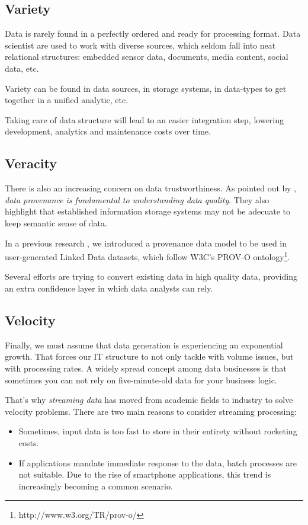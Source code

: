 \subsection{Variety}

Data is rarely found in a perfectly ordered and ready for processing format. Data scientist are used to work with diverse sources, which seldom fall into neat relational structures: embedded sensor data, documents, media content, social data, etc.

Variety can be found in data sources, in storage systems, in data-types to get together in a unified analytic, etc.

Taking care of data structure will lead to an easier integration step, lowering development, analytics and maintenance costs over time.

\subsection{Veracity}

There is also an increasing concern on data trustworthiness. As pointed out by \cite{buneman2013data}, \textit{data provenance is fundamental to understanding data quality}. They also highlight that established information storage systems may not be adecuate to keep semantic sense of data.

In a previous research \cite{emalditrust}, we introduced a provenance data model to be used in user-generated Linked Data datasets, which follow W3C's PROV-O ontology\footnote{http://www.w3.org/TR/prov-o/}.

Several efforts are trying to convert existing data in high quality data, providing an extra confidence layer in which data analysts can rely. 

\subsection{Velocity}

Finally, we must assume that data generation is experiencing an exponential growth. That forces our IT structure to not only tackle with volume issues, but with processing rates. A widely spread concept among data businesses is that sometimes you can not rely on five-minute-old data for your business logic.

That's why \textit{streaming data} has moved from academic fields to industry to solve velocity problems. There are two main reasons to consider streaming processing:
\begin{itemize}
	\item Sometimes, input data is too fast to store in their entirety without rocketing costs.
	\item If applications mandate immediate response to the data, batch processes are not suitable. Due to the rise of smartphone applications, this trend is increasingly becoming a common scenario.
\end{itemize}
